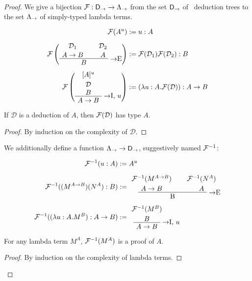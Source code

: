 \begin{proof}
We give a bijection $\mathcal{F}: \mathsf{D}_\to \to \Lambda_\to$ from the set $\mathsf{D}_\to$
of \implnpi\ deduction trees to the set $\Lambda_\to$ of simply-typed lambda terms.

\begin{alignat*}{2}
\chmap(A^u) &:= u: A \\[6pt]
\chmap\left(
  \AxiomC{$\mathcal{D}_1$}
  \noLine
  \UnaryInfC{$A \to B$}
  \AxiomC{$\mathcal{D}_2$}
  \noLine
  \UnaryInfC{$A$}
  \RightLabel{$\to$E}
  \BinaryInfC{$B$}
  \DisplayProof
\right) &:= \chmap(\mathcal{D}_1) \chmap(\mathcal{D}_2): B \\[6pt]
\chmap\left(
  \AxiomC{$[A]^u$}
  \noLine
  \UnaryInfC{$\mathcal{D}$}
  \noLine
  \UnaryInfC{$B$}
  \RightLabel{$\to$I, $u$}
  \UnaryInfC{$A \to B$}
  \DisplayProof
\right) &:= (\lambda u: A.\chmap(\mathcal{D})): A \to B
\end{alignat*}

\begin{proposition}
If $\mathcal{D}$ is a deduction of $A$, then $\mathcal{F}(\mathcal{D})$ has type $A$.
\end{proposition}

\begin{proof}
By induction on the complexity of $\mathcal{D}$.
\end{proof}

We additionally define a function $\Lambda_\to \to \mathsf{D}_\to$, suggestively
named $\mathcal{F}^{-1}$:

\begin{alignat*}{2}
\chmapanta(u: A) & := A^u \\[6pt]
\chmapanta((M^{A \to B})(N^A): B) &:=
  \AxiomC{$\chmapanta(M^{A \to B})$}
  \noLine
  \UnaryInfC{$A \to B$}
  \AxiomC{$\chmapanta(N^A)$}
  \noLine
  \UnaryInfC{$A$}
  \RightLabel{$\to$E}
  \BinaryInfC{B}
  \DisplayProof \\[6pt]
\chmapanta((\lambda u:A.M^B):A \to B) &:=
  \AxiomC{$\chmapanta(M^B)$}
  \noLine
  \UnaryInfC{$B$}
  \RightLabel{$\to$I, $u$}
  \UnaryInfC{$A \to B$}
  \DisplayProof
\end{alignat*}

\begin{proposition}
For any lambda term $M^A$, $\mathcal{F}^{-1}(M^A)$ is a proof of $A$.
\end{proposition}

\begin{proof}
By induction on the complexity of lambda terms.
\end{proof}


\end{proof}

